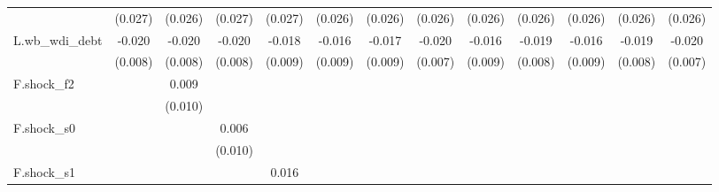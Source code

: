 {\begin{tabular}{l*{12}{c}}
            &     (0.027)         &     (0.026)         &     (0.027)         &     (0.027)         &     (0.026)         &     (0.026)         &     (0.026)         &     (0.026)         &     (0.026)         &     (0.026)         &     (0.026)         &     (0.026)         \\
\addlinespace
L.wb\_wdi\_debt&      -0.020\sym{**} &      -0.020\sym{**} &      -0.020\sym{**} &      -0.018\sym{**} &      -0.016\sym{*}  &      -0.017\sym{*}  &      -0.020\sym{**} &      -0.016\sym{*}  &      -0.019\sym{**} &      -0.016\sym{*}  &      -0.019\sym{**} &      -0.020\sym{**} \\
            &     (0.008)         &     (0.008)         &     (0.008)         &     (0.009)         &     (0.009)         &     (0.009)         &     (0.007)         &     (0.009)         &     (0.008)         &     (0.009)         &     (0.008)         &     (0.007)         \\
\addlinespace
F.shock\_f2  &                     &       0.009         &                     &                     &                     &                     &                     &                     &                     &                     &                     &                     \\
            &                     &     (0.010)         &                     &                     &                     &                     &                     &                     &                     &                     &                     &                     \\
\addlinespace
F.shock\_s0  &                     &                     &       0.006         &                     &                     &                     &                     &                     &                     &                     &                     &                     \\
            &                     &                     &     (0.010)         &                     &                     &                     &                     &                     &                     &                     &                     &                     \\
\addlinespace
F.shock\_s1  &                     &                     &                     &       0.016\sym{*}  &                     &                     &                     &                     &                     &                     &                     &                     \\

\end{tabular}}
